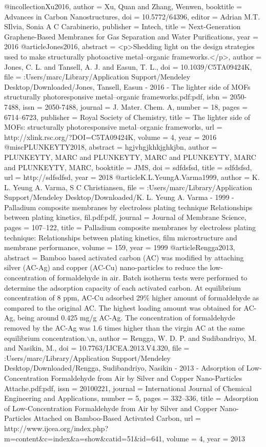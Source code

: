@incollection{Xu2016,
author = {Xu, Quan and Zhang, Wenwen},
booktitle = {Advances in Carbon Nanostructures},
doi = {10.5772/64396},
editor = {{Adrian M.T. SIlvia}, Sonia A C Carabinerio},
publisher = {Intech},
title = {{Next-Generation Graphene-Based Membranes for Gas Separation and Water Purifications}},
year = {2016}
}
@article{Jones2016,
abstract = {{\textless}p{\textgreater}Shedding light on the design strategies used to make structurally photoactive metal–organic frameworks.{\textless}/p{\textgreater}},
author = {Jones, C. L. and Tansell, A. J. and Easun, T. L.},
doi = {10.1039/C5TA09424K},
file = {:Users/marc/Library/Application Support/Mendeley Desktop/Downloaded/Jones, Tansell, Easun - 2016 - The lighter side of MOFs structurally photoresponsive metal–organic frameworks.pdf:pdf},
isbn = {2050-7488},
issn = {2050-7488},
journal = {J. Mater. Chem. A},
number = {18},
pages = {6714--6723},
publisher = {Royal Society of Chemistry},
title = {{The lighter side of MOFs: structurally photoresponsive metal–organic frameworks}},
url = {http://xlink.rsc.org/?DOI=C5TA09424K},
volume = {4},
year = {2016}
}
@misc{PLUNKEYTY2018,
abstract = {hgjvhgjkhkjghkjbn},
author = {PLUNKEYTY, MARC and PLUNKEYTY, MARC and PLUNKEYTY, MARC and PLUNKEYTY, MARC},
booktitle = {JMS},
doi = {sdfdsfsd},
title = {sdfdsfsd},
url = {http://sdfsdfsd},
year = {2018}
}
@article{K.L.YeungA.Varma1999,
author = {{K. L. Yeung  A. Varma}, S C Christiansen},
file = {:Users/marc/Library/Application Support/Mendeley Desktop/Downloaded/K. L. Yeung A. Varma - 1999 - Palladium composite membranes by electroless plating technique Relationships between plating kinetics, fil.pdf:pdf},
journal = {Journal of Membrane Science},
pages = {107--122},
title = {{Palladium composite membranes by electroless plating technique: Relationships between plating kinetics, film microstructure and membrane performance}},
volume = {159},
year = {1999}
}
@article{Rengga2013,
abstract = {Bamboo based activated carbon (AC) was modified by attaching silver (AC-Ag) and copper (AC-Cu) nano-particles to reduce the low-concentration of formaldehyde in air. Batch isotherm tests were performed to determine the adsorption capacity of each activated carbon. At equilibrium concentration of 8 ppm, AC-Cu adsorbed 29{\%} higher amount of formaldehyde as compared to the original AC. The highest loading amount was obtained for AC-Ag, being around 0.425 mg/g AC-Ag. The concentration of formaldehyde removed by the AC-Ag was 1.6 times higher than the virgin AC at the same equilibrium concentration.$\backslash$n},
author = {Rengga, W. D. P. and Sudibandriyo, M. and Nasikin, M.},
doi = {10.7763/IJCEA.2013.V4.320},
file = {:Users/marc/Library/Application Support/Mendeley Desktop/Downloaded/Rengga, Sudibandriyo, Nasikin - 2013 - Adsorption of Low-Concentration Formaldehyde from Air by Silver and Copper Nano-Particles Attache.pdf:pdf},
issn = {20100221},
journal = {International Journal of Chemical Engineering and Applications},
number = {5},
pages = {332--336},
title = {{Adsorption of Low-Concentration Formaldehyde from Air by Silver and Copper Nano-Particles Attached on Bamboo-Based Activated Carbon}},
url = {http://www.ijcea.org/index.php?m=content{\&}c=index{\&}a=show{\&}catid=51{\&}id=641},
volume = {4},
year = {2013}
}
